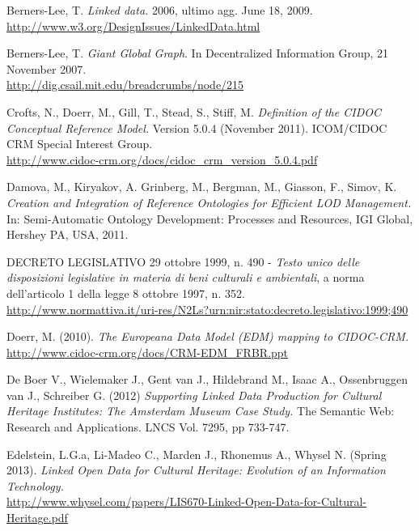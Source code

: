 \begin{thebibliography}{90}
\rhead[\fancyplain{}{\bfseries \leftmark}]{\fancyplain{}{\bfseries
\thepage}}


 Berners-Lee, T. \emph{Linked data.} 2006, ultimo agg. June 18, 2009.\\
\url{http://www.w3.org/DesignIssues/LinkedData.html}

 Berners-Lee, T. \emph{Giant Global Graph}. In Decentralized Information Group, 21 November 2007.\\
\url{http://dig.csail.mit.edu/breadcrumbs/node/215}

 Crofts, N., Doerr, M., Gill, T., Stead, S., Stiff, M. \emph{Definition of the CIDOC Conceptual Reference Model.} Version 5.0.4 (November 2011). ICOM/CIDOC CRM Special Interest Group.\\
\url{http://www.cidoc-crm.org/docs/cidoc_crm_version_5.0.4.pdf}

 Damova, M., Kiryakov, A. Grinberg, M., Bergman, M., Giasson, F., Simov, K. \emph{Creation and Integration of Reference Ontologies for Efficient LOD Management.} In: Semi-Automatic Ontology Development: Processes and Resources, IGI Global, Hershey PA, USA, 2011.

 DECRETO LEGISLATIVO 29 ottobre 1999, n. 490 - \emph{Testo unico delle disposizioni legislative in materia di beni culturali e ambientali}, a norma dell'articolo 1 della legge 8 ottobre 1997, n. 352.\\
\url{http://www.normattiva.it/uri-res/N2Ls?urn:nir:stato:decreto.legislativo:1999;490}

 Doerr, M. (2010). \emph{The Europeana Data Model (EDM) mapping to CIDOC-CRM.}\\
\url{http://www.cidoc-crm.org/docs/CRM-EDM_FRBR.ppt}

 De Boer V., Wielemaker J., Gent van J., Hildebrand M., Isaac A., Ossenbruggen van J., Schreiber G. (2012) \emph{Supporting Linked Data Production for Cultural Heritage Institutes: The Amsterdam Museum Case Study.} The Semantic Web: Research and Applications. LNCS Vol. 7295, pp 733-747.

 Edelstein, L.G.a, Li-Madeo C., Marden J., Rhonemus A., Whysel N. (Spring 2013). \emph{Linked Open Data for Cultural Heritage: Evolution of an Information Technology.}\\
\url{http://www.whysel.com/papers/LIS670-Linked-Open-Data-for-Cultural-Heritage.pdf}


\end{thebibliography}
